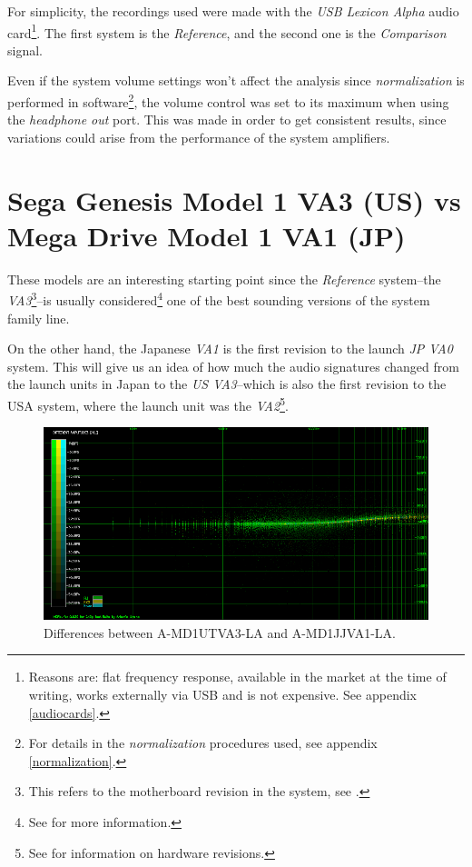 \documentclass[10pt,a4paper]{report}
\begin{document}
For simplicity, the recordings used were made with the \textit{USB Lexicon Alpha} audio card\footnote{Reasons are: flat frequency response, available in the market at the time of writing, works externally via USB and is not expensive. See appendix \ref{audiocards}.}. The first system is the \textit{Reference}, and the second one is the \textit{Comparison} signal.

Even if the system volume settings won't affect the analysis since \textit{normalization} is performed in software\footnote{For details in the \textit{normalization} procedures used, see appendix \ref{normalization}.}, the volume control was set to its maximum when using the \textit{headphone out} port. This was made in order to get consistent results, since variations could arise from the performance of the system amplifiers.

\section{Sega Genesis Model 1 VA3 (US) vs\\ Mega Drive Model 1 VA1 (JP)}

These models are an interesting starting point since the \textit{Reference} system--the \textit{VA3}\footnote{This refers to the motherboard revision in the system, see \cite{genesisaudio}.}--is usually considered\footnote{See \cite{genesisaudio2} for more information.} one of the best sounding versions of the system family line. 

On the other hand, the Japanese \textit{VA1} is the first revision to the launch \textit{JP VA0} system. This will give us an idea of how much the audio signatures changed from the launch units in Japan to the \textit{US VA3}--which is also the first revision to the USA system, where the launch unit was the \textit{VA2}\footnote{See \cite{genesishw} for information on hardware revisions.}.

\begin{figure}[H]
	\centering
	\includegraphics[width=1.0\linewidth]{images/results/1-A-MD1UTVA3-LA_vs_A-MD1JJVA1-LA.png}
	\caption[A-MD1UTVA3-LA vs A-MD1JJVA1-LA]{Differences between A-MD1UTVA3-LA and A-MD1JJVA1-LA.}
	\label{fig:A-MD1UTVA3-LA_vs_A-MD1JJVA1-LA}
\end{figure}
\end{document}
